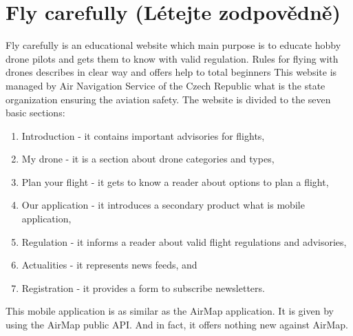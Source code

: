 \section{Fly carefully (L{\' e}tejte zodpov{\v e}dn{\v e})}\label{sec:fly-carefully}
Fly carefully is an educational website which main purpose is to educate hobby drone pilots and gets them to know with valid regulation.
Rules for flying with drones describes in clear way and offers help to total beginners
This website is managed by Air Navigation Service of the Czech Republic what is the state organization ensuring the aviation safety.
The website is divided to the seven basic sections:
\begin{enumerate}
    \item Introduction - it contains important advisories for flights,
    \item My drone - it is a section about drone categories and types,
    \item Plan your flight - it gets to know a reader about options to plan a flight,
    \item Our application - it introduces a secondary product what is mobile application,
    \item Regulation - it informs a reader about valid flight regulations and advisories,
    \item Actualities - it represents news feeds, and
    \item Registration - it provides a form to subscribe newsletters.\cite{flyCarefully}
\end{enumerate}
This mobile application is as similar as the AirMap application.
It is given by using the AirMap public API.
And in fact, it offers nothing new against AirMap.
